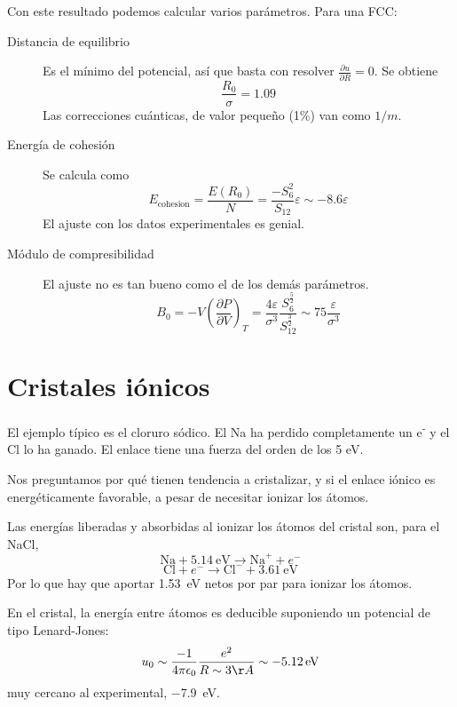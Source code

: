 Con este resultado podemos calcular varios parámetros. Para una FCC:
\begin{description}
\item[Distancia de equilibrio] Es el mínimo del potencial, así que
basta con resolver $\frac{\partial u}{\partial R} = 0$. Se obtiene 
  \begin{equation}
    \frac{R_0}{\sigma}=1.09
  \end{equation}
Las correcciones cuánticas, de valor pequeño (1\%) van como $1/m$.
\item[Energía de cohesión] Se calcula como
  \begin{equation}
    E_{\text{cohesion}} = \frac{E(R_0)}{N} =
    \frac{-S_6^2}{S_{12}}\varepsilon \sim -8.6 \varepsilon
  \end{equation}
El ajuste con los datos experimentales es genial.
\item[Módulo de compresibilidad] El ajuste no es tan bueno como el de
  los demás parámetros.
  \begin{equation}
    B_0 = -V \left( \frac{\partial P}{\partial V} \right) _T =
    \frac{4\varepsilon}{\sigma^3}\frac{S_6^\frac{5}{2}}{S_{12}^
      \frac{3}{2}} \sim 75 \frac{\varepsilon}{\sigma^3}
  \end{equation}
\end{description}

\section{Cristales iónicos}
El ejemplo típico es el cloruro sódico. El Na ha perdido completamente
un e\textsuperscript{-} y el Cl lo ha ganado. El enlace tiene una
fuerza del orden de los 5 eV. 

Nos preguntamos por qué tienen tendencia a cristalizar, y si el enlace
iónico es energéticamente favorable, a pesar de necesitar ionizar los
átomos.

Las energías liberadas y absorbidas al ionizar los átomos del cristal
son, para el NaCl,
\begin{equation*}
  \text{Na} + \SI{5.14}{\eV}\rightarrow \text{Na}^+ + e^-
\end{equation*}
\begin{equation*}
  \text{Cl} + e^- \rightarrow \text{Cl}^- + \SI{3.61}{\eV} 
\end{equation*}
Por lo que hay que aportar \SI{1.53}{\eV} netos por par para ionizar los
átomos. 

En el cristal, la energía entre átomos es deducible suponiendo un
potencial de tipo Lenard-Jones:
\begin{equation}
  u_0 \sim \frac{-1}{4\pi\epsilon_0}\frac{e^2}{R\sim 3 \AA} \sim \SI{-5.12}{\eV} 
\end{equation}
muy cercano al experimental,  \SI{-7.9}{\eV}.

